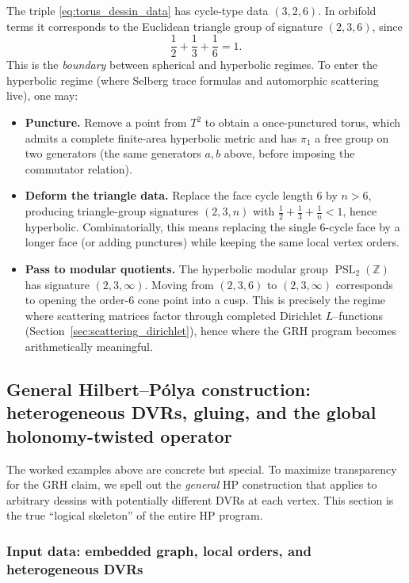 \documentclass[11pt,oneside]{amsbook}
\numberwithin{equation}{section}
\theoremstyle{plain}
\theoremstyle{definition}
\theoremstyle{remark}
\newcommand{\Z}{\mathbb{Z}}
\DeclareMathOperator{\PSL}{\mathrm{PSL}}
\begin{document}
The triple \eqref{eq:torus_dessin_data} has cycle-type data $(3,2,6)$.
In orbifold terms it corresponds to the Euclidean triangle group of signature $(2,3,6)$, since
\[
\frac12+\frac13+\frac16=1.
\]
This is the \emph{boundary} between spherical and hyperbolic regimes.
To enter the hyperbolic regime (where Selberg trace formulas and automorphic scattering live), one may:
\begin{itemize}
\item \textbf{Puncture.} Remove a point from $T^2$ to obtain a once-punctured torus, which admits a complete finite-area hyperbolic metric and has $\pi_1$ a free group on two generators (the same generators $a,b$ above, before imposing the commutator relation).
\item \textbf{Deform the triangle data.} Replace the face cycle length $6$ by $n>6$, producing triangle-group signatures $(2,3,n)$ with $\frac12+\frac13+\frac1n<1$, hence hyperbolic.
Combinatorially, this means replacing the single 6-cycle face by a longer face (or adding punctures) while keeping the same local vertex orders.
\item \textbf{Pass to modular quotients.} The hyperbolic modular group $\PSL_2(\Z)$ has signature $(2,3,\infty)$.
Moving from $(2,3,6)$ to $(2,3,\infty)$ corresponds to opening the order-6 cone point into a cusp.
This is precisely the regime where scattering matrices factor through completed Dirichlet $L$--functions (Section~\ref{sec:scattering_dirichlet}), hence where the GRH program becomes arithmetically meaningful.
\end{itemize}



\subsection{General Hilbert--Pólya construction: heterogeneous DVRs, gluing, and the global holonomy-twisted operator}
\label{sec:general_HP_construction}

The worked examples above are concrete but special.
To maximize transparency for the GRH claim, we spell out the \emph{general} HP construction that applies to arbitrary dessins with potentially different DVRs at each vertex.
This section is the true ``logical skeleton'' of the entire HP program.

\subsubsection{Input data: embedded graph, local orders, and heterogeneous DVRs}
\end{document}

